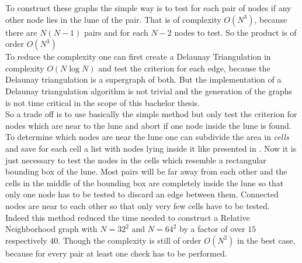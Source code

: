     To construct these graphs the simple way is to test for each
    pair of nodes if any other node lies in
    the lune of the pair. That is of complexity \(O (N^3)\), because
    there are \(N(N-1)\) pairs and for each \(N-2\) nodes to test. So
    the product is of order \(O(N^3)\)\\
    To reduce the complexity one can first create a Delaunay
    Triangulation in complexity \(O (N \log N)\)
    \cite{RNGCell} and test the criterion for each edge, because
    the Delaunay triangulation is a supergraph of both. But the
    implementation of a Delaunay triangulation algorithm is not trivial
    and the generation of the graphs is not time critical in the scope
    of this bachelor thesis.\\
    So a trade off is to use basically the simple method but only test
    the criterion for nodes which are near to the lune and abort if
    one node inside the lune is found. To determine which nodes are
    near the lune one can subdivide the area in \emph{cells} and save
    for each cell a list with nodes lying inside it like presented in
    \cite{RNGCell}.
    Now it is just necessary to test the nodes in the cells which
    resemble a rectangular bounding box of the lune. Most pairs will be
    far away from each other and the cells in the middle of the bounding
    box are completely inside the lune so that only one node has to be
    tested to discard an edge between them. Connected nodes are near to
    each other so that only very few cells have to be tested.\\
    Indeed this method reduced the time needed to construct a Relative
    Neighborhood graph with \(N=32^2\) and \(N=64^2\) by a factor of
    over \(15\) respectively \(40\). Though the complexity is still of
    order \(O(N^2)\) in the best case, because for every pair at least
    one check has to be performed.
